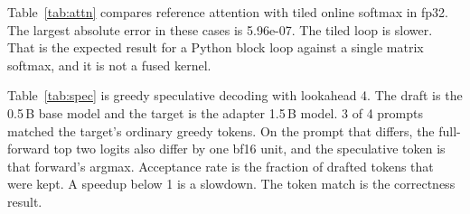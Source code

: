 Table~\ref{tab:attn} compares reference attention with tiled online softmax in fp32.
The largest absolute error in these cases is 5.96e-07.
The tiled loop is slower. That is the expected result for a Python block loop against a single matrix softmax, and it is not a fused kernel.

\begin{table}[t]
\centering
\caption{Reference and tiled attention. Shapes are batch, heads, sequence, and head size. Times are seconds.}
\label{tab:attn}
\end{table}

Table~\ref{tab:spec} is greedy speculative decoding with lookahead 4.
The draft is the 0.5\,B base model and the target is the adapter 1.5\,B model.
3 of 4 prompts matched the target's ordinary greedy tokens.
On the prompt that differs, the full-forward top two logits also differ by one bf16 unit, and the speculative token is that forward's argmax.
Acceptance rate is the fraction of drafted tokens that were kept.
A speedup below 1 is a slowdown. The token match is the correctness result.

\begin{table}[t]
\centering
\caption{Speculative decoding against target greedy decoding. 32 new tokens, lookahead 4.}
\label{tab:spec}
\end{table}
